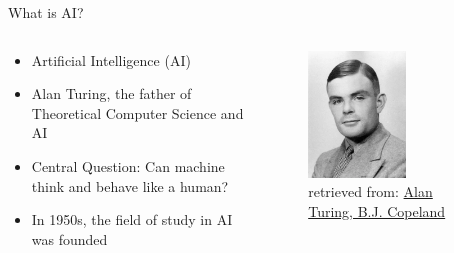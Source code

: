 \documentclass[10pt,xcolor={table,dvipsnames},t]{beamer}
\begin{document}
\begin{frame}{What is AI?}
  \begin{columns}
    \begin{column}[T]{0.6\textwidth}
      \begin{itemize}
        \item Artificial Intelligence (AI)
        \item Alan Turing, the father of Theoretical Computer Science and AI
        \item Central Question: Can machine think and behave like a human?
        \item In 1950s, the field of study in AI was founded
      \end{itemize}
    \end{column}
    \begin{column}[T]{0.4\textwidth}
      \begin{figure}
        \includegraphics[width=0.6\textwidth]{img/Alan-Turing.png}
        \caption{retrieved from: \href{https://www.britannica.com/biography/Alan-Turing}{Alan Turing, B.J. Copeland}}
      \end{figure}
    \end{column}
  \end{columns}
\end{frame}
\end{document}
